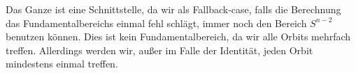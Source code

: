          \noindent Das Ganze ist eine Schnittstelle, da wir als Fallback-case, falls die Berechnung das Fundamentalbereichs einmal fehl schlägt, immer noch 
         den Bereich $S^{n-2}$ benutzen können. Dies ist kein Fundamentalbereich, da wir alle Orbits mehrfach treffen. Allerdings werden wir, außer im Falle
         der Identität, jeden Orbit mindestens einmal treffen.


